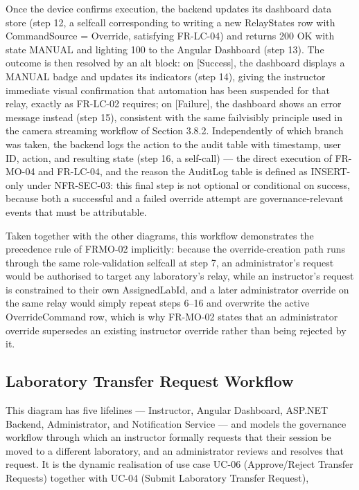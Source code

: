 Once the device confirms execution, the backend updates its dashboard data store (step 12, a selfcall corresponding to writing a new RelayStates row with CommandSource = Override, satisfying
FR-LC-04) and returns 200 OK with state MANUAL and lighting 100 to the Angular Dashboard
(step 13). The outcome is then resolved by an alt block: on [Success], the dashboard displays a
MANUAL badge and updates its indicators (step 14), giving the instructor immediate visual
confirmation that automation has been suspended for that relay, exactly as FR-LC-02 requires; on
[Failure], the dashboard shows an error message instead (step 15), consistent with the same failvisibly principle used in the camera streaming workflow of Section 3.8.2. Independently of which
branch was taken, the backend logs the action to the audit table with timestamp, user ID, action,
and resulting state (step 16, a self-call) --- the direct execution of FR-MO-04 and FR-LC-04, and
the reason the AuditLog table is defined as INSERT-only under NFR-SEC-03: this final step is not
optional or conditional on success, because both a successful and a failed override attempt are
governance-relevant events that must be attributable.

Taken together with the other diagrams, this workflow demonstrates the precedence rule of FRMO-02 implicitly: because the override-creation path runs through the same role-validation selfcall at step 7, an administrator's request would be authorised to target any laboratory's relay, while
an instructor's request is constrained to their own AssignedLabId, and a later administrator
override on the same relay would simply repeat steps 6--16 and overwrite the active
OverrideCommand row, which is why FR-MO-02 states that an administrator override supersedes
an existing instructor override rather than being rejected by it.

\subsection{Laboratory Transfer Request Workflow}

This diagram has five lifelines --- Instructor, Angular Dashboard, ASP.NET Backend,
Administrator, and Notification Service --- and models the governance workflow through which an
instructor formally requests that their session be moved to a different laboratory, and an
administrator reviews and resolves that request. It is the dynamic realisation of use case UC-06
(Approve/Reject Transfer Requests) together with UC-04 (Submit Laboratory Transfer Request),

